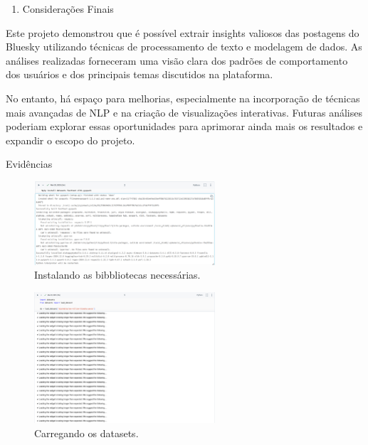 \documentclass[
  letterpaper,
  DIV=11,
  numbers=noendperiod]{scrartcl}
\providecommand{\tightlist}{%
  \setlength{\itemsep}{0pt}\setlength{\parskip}{0pt}}\usepackage{longtable,booktabs,array}
\begin{document}
\begin{enumerate}
\def\labelenumi{\arabic{enumi}.}
\setcounter{enumi}{4}
\tightlist
\item
  Considerações Finais
\end{enumerate}

Este projeto demonstrou que é possível extrair insights valiosos das
postagens do Bluesky utilizando técnicas de processamento de texto e
modelagem de dados. As análises realizadas forneceram uma visão clara
dos padrões de comportamento dos usuários e dos principais temas
discutidos na plataforma.

No entanto, há espaço para melhorias, especialmente na incorporação de
técnicas mais avançadas de NLP e na criação de visualizações
interativas. Futuras análises poderiam explorar essas oportunidades para
aprimorar ainda mais os resultados e expandir o escopo do projeto.

Evidências 

\begin{figure}[htbp]
    \centering
    \includegraphics[width=0.6\textwidth]{evidencias/evidencia1.png}
    \caption{Instalando as bibbliotecas necessárias.}
    \label{fig:exemplo}
\end{figure}

\begin{figure}[htbp]
    \centering
    \includegraphics[width=0.6\textwidth]{evidencias/evidencia2.png}
    \caption{Carregando os datasets.}
    \label{fig:exemplo}
\end{figure}
\end{document}
